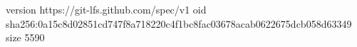 version https://git-lfs.github.com/spec/v1
oid sha256:0a15c8d02851cd747f8a718220c4f1bc8fac03678acab0622675dcb058d63349
size 5590
